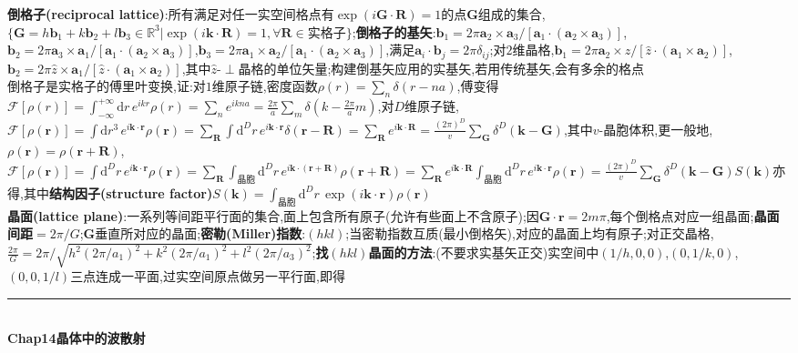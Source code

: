 \documentclass[UTF8,10pt,a4paper]{article}
\begin{document}
\begin{multicols}{2}
\textbf{倒格子(reciprocal lattice)}:所有满足对任一实空间格点有$\exp(i\bm{G}\cdot\bm{R})=1$的点$\bm{G}$组成的集合,$\{\bm{G}=h\bm{b}_1+k\bm{b}_2+l\bm{b}_3\in\mathbb{R}^3\vert\exp(i\bm{k}\cdot\bm{R})=1,\forall\bm{R}\in\text{实格子}\}$;\textbf{倒格子的基矢}:$\bm{b}_1=2\pi\bm{a}_2\times\bm{a}_3/[\bm{a}_1\cdot(\bm{a}_2\times\bm{a}_3)]$,$\bm{b}_2=2\pi\bm{a}_3\times\bm{a}_1/[\bm{a}_1\cdot(\bm{a}_2\times\bm{a}_3)]$,$\bm{b}_3=2\pi\bm{a}_1\times\bm{a}_2/[\bm{a}_1\cdot(\bm{a}_2\times\bm{a}_3)]$,满足$\bm{a}_i\cdot\bm{b}_j=2\pi\delta_{ij}$;对$2$维晶格,$\bm{b}_1=2\pi\bm{a}_2\times\hat{z}/[\hat{z}\cdot(\bm{a}_1\times\bm{a}_2)]$,$\bm{b}_2=2\pi\hat{z}\times\bm{a}_1/[\hat{z}\cdot(\bm{a}_1\times\bm{a}_2)]$,其中$\hat{z}$-$\perp$晶格的单位矢量;构建倒基矢应用的实基矢,若用传统基矢,会有多余的格点\\
倒格子是实格子的傅里叶变换,证:对$1$维原子链,密度函数$\rho(r)=\sum_n\delta(r-na)$,傅变得$\mathcal{F}[\rho(r)]=\int_{-\infty}^{+\infty}\mathrm{d}r\,e^{ikr}\rho(r)=\sum_ne^{ikna}=\frac{2\pi}{a}\sum_m\delta(k-\frac{2\pi}{a}m)$,对$D$维原子链,$\mathcal{F}[\rho(\bm{r})]=\int\mathrm{d}r^3\,e^{i\bm{k}\cdot\bm{r}}\rho(\bm{r})=\sum_{\bm{R}}\int\mathrm{d}^Dr\,e^{i\bm{k}\cdot\bm{r}}\delta(\bm{r}-\bm{R})=\sum_{\bm{R}}e^{i\bm{k}\cdot\bm{R}}=\frac{(2\pi)^D}{v}\sum_{\bm{G}}\delta^D(\bm{k}-\bm{G})$,其中$v$-晶胞体积,更一般地,$\rho(\bm{r})=\rho(\bm{r}+\bm{R})$,$\mathcal{F}[\rho(\bm{r})]=\int\mathrm{d}^Dr\,e^{i\bm{k}\cdot\bm{r}}\rho(\bm{r})=\sum_{\bm{R}}\int_{\text{晶胞}}\mathrm{d}^Dr\,e^{i\bm{k}\cdot(\bm{r}+\bm{R})}\rho(\bm{r}+\bm{R})=\sum_{\bm{R}}e^{i\bm{k}\cdot\bm{R}}\int_{\text{晶胞}}\mathrm{d}^Dr\,e^{i\bm{k}\cdot\bm{r}}\rho(\bm{r})=\frac{(2\pi)^D}{v}\sum_{\bm{G}}\delta^D(\bm{k}-\bm{G})S(\bm{k})$亦得,其中\textbf{结构因子(structure factor)}$S(\bm{k})=\int_{\text{晶胞}}\mathrm{d}^Dr\,\exp(i\bm{k}\cdot\bm{r})\rho(\bm{r})$\\
\textbf{晶面(lattice plane)}:一系列等间距平行面的集合,面上包含所有原子(允许有些面上不含原子);因$\bm{G}\cdot\bm{r}=2m\pi$,每个倒格点对应一组晶面;\textbf{晶面间距}$=2\pi/G$;$\bm{G}$垂直所对应的晶面;\textbf{密勒(Miller)指数}:$(hkl)$;当密勒指数互质(最小倒格矢),对应的晶面上均有原子;对正交晶格,$\frac{2\pi}{G}=2\pi/\sqrt{h^2(2\pi/a_1)^2+k^2(2\pi/a_1)^2+l^2(2\pi/a_3)^2}$;\textbf{找$(hkl)$晶面的方法}:(不要求实基矢正交)实空间中$(1/h,0,0)$,$(0,1/k,0)$,$(0,0,1/l)$三点连成一平面,过实空间原点做另一平行面,即得\\
\rule{\columnwidth}{.2pt}\\
\textbf{Chap14晶体中的波散射}\\

\end{multicols}
\end{document}
